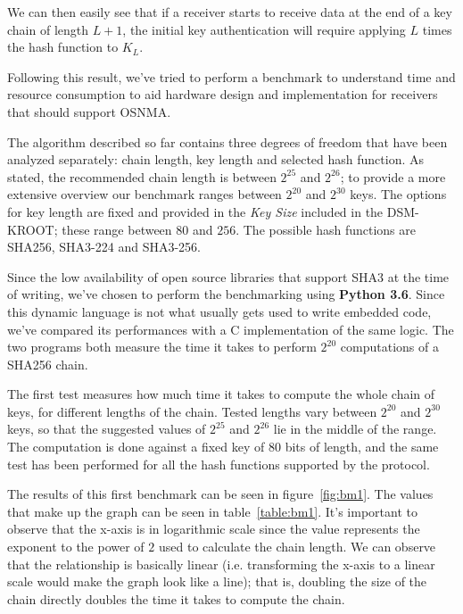We can then easily see that if a receiver starts to receive data at the end of a
key chain of length $L+1$, the initial key authentication will require applying
$L$ times the hash function to $K_L$.

\par

Following this result, we've tried to perform a benchmark to understand time and
resource consumption to aid hardware design and implementation for receivers
that should support OSNMA.

The algorithm described so far contains three degrees of freedom that have been
analyzed separately: chain length, key length and selected hash function. As
stated, the recommended chain length is between $2^{25}$ and $2^{26}$; to
provide a more extensive overview our benchmark ranges between $2^{20}$ and
$2^{30}$ keys. The options for key length are fixed and provided in the
\textit{Key Size} included in the DSM-KROOT; these range between $80$ and $256$.
The possible hash functions are SHA256, SHA3-224 and SHA3-256.

Since the low availability of open source libraries that support SHA3 at the
time of writing, we've chosen to perform the benchmarking using \textbf{Python
3.6}. Since this dynamic language is not what usually gets used to write
embedded code, we've compared its performances with a C implementation of the
same logic. The two programs both measure the time it takes to perform $2^{20}$
computations of a SHA256 chain.

\par

The first test measures how much time it takes to compute the whole chain of
keys, for different lengths of the chain. Tested lengths vary between $2^{20}$
and $2^{30}$ keys, so that the suggested values of $2^{25}$ and $2^{26}$ lie in
the middle of the range. The computation is done against a fixed key of $80$
bits of length, and the same test has been performed for all the hash functions
supported by the protocol.


The results of this first benchmark can be seen in figure~\ref{fig:bm1}. The values
that make up the graph can be seen in table~\ref{table:bm1}. It's important to
observe that the x-axis is in logarithmic scale since the value represents the
exponent to the power of $2$ used to calculate the chain length.  We can observe
that the relationship is basically linear (i.e. transforming the x-axis to a
linear scale would make the graph look like a line); that is, doubling the size
of the chain directly doubles the time it takes to compute the chain.

